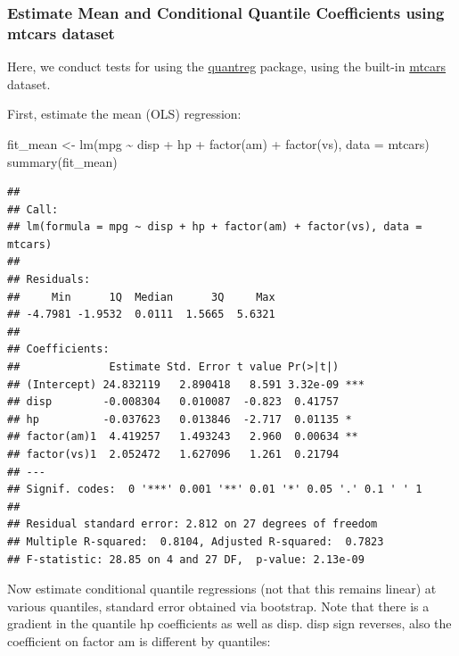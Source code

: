 \documentclass[
]{book}
\newenvironment{Shaded}{\begin{snugshade}}{\end{snugshade}}
\newcommand{\AttributeTok}[1]{\textcolor[rgb]{0.77,0.63,0.00}{#1}}
\newcommand{\FunctionTok}[1]{\textcolor[rgb]{0.00,0.00,0.00}{#1}}
\newcommand{\NormalTok}[1]{#1}
\newcommand{\OtherTok}[1]{\textcolor[rgb]{0.56,0.35,0.01}{#1}}
\newcommand{\SpecialCharTok}[1]{\textcolor[rgb]{0.00,0.00,0.00}{#1}}
\begin{document}
\hypertarget{estimate-mean-and-conditional-quantile-coefficients-using-mtcars-dataset}{%
\subsubsection{Estimate Mean and Conditional Quantile Coefficients using mtcars dataset}\label{estimate-mean-and-conditional-quantile-coefficients-using-mtcars-dataset}}

Here, we conduct tests for using the \href{https://cran.r-project.org/web/packages/quantreg/index.html}{quantreg} package, using the built-in \href{https://stat.ethz.ch/R-manual/R-devel/library/datasets/html/mtcars.html}{mtcars} dataset.

First, estimate the mean (OLS) regression:

\begin{Shaded}
\begin{Highlighting}[]
\NormalTok{fit\_mean }\OtherTok{\textless{}{-}} \FunctionTok{lm}\NormalTok{(mpg }\SpecialCharTok{\textasciitilde{}}\NormalTok{ disp }\SpecialCharTok{+}\NormalTok{ hp }\SpecialCharTok{+} \FunctionTok{factor}\NormalTok{(am) }\SpecialCharTok{+} \FunctionTok{factor}\NormalTok{(vs), }\AttributeTok{data =}\NormalTok{ mtcars)}
\FunctionTok{summary}\NormalTok{(fit\_mean)}
\end{Highlighting}
\end{Shaded}

\begin{verbatim}
## 
## Call:
## lm(formula = mpg ~ disp + hp + factor(am) + factor(vs), data = mtcars)
## 
## Residuals:
##     Min      1Q  Median      3Q     Max 
## -4.7981 -1.9532  0.0111  1.5665  5.6321 
## 
## Coefficients:
##              Estimate Std. Error t value Pr(>|t|)    
## (Intercept) 24.832119   2.890418   8.591 3.32e-09 ***
## disp        -0.008304   0.010087  -0.823  0.41757    
## hp          -0.037623   0.013846  -2.717  0.01135 *  
## factor(am)1  4.419257   1.493243   2.960  0.00634 ** 
## factor(vs)1  2.052472   1.627096   1.261  0.21794    
## ---
## Signif. codes:  0 '***' 0.001 '**' 0.01 '*' 0.05 '.' 0.1 ' ' 1
## 
## Residual standard error: 2.812 on 27 degrees of freedom
## Multiple R-squared:  0.8104, Adjusted R-squared:  0.7823 
## F-statistic: 28.85 on 4 and 27 DF,  p-value: 2.13e-09
\end{verbatim}

Now estimate conditional quantile regressions (not that this remains linear) at various quantiles, standard error obtained via bootstrap. Note that there is a gradient in the quantile hp coefficients as well as disp. disp sign reverses, also the coefficient on factor am is different by quantiles:
\end{document}
